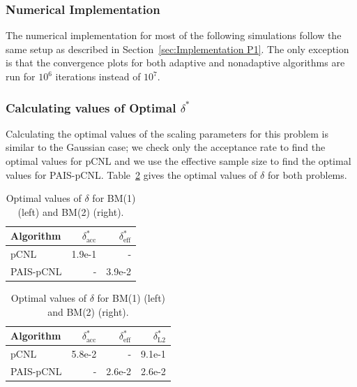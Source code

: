 \documentclass[final]{siamltex}
\begin{document}
\subsubsection{Numerical Implementation}\label{sec:Implementation P2}

The numerical implementation for most of the following simulations follow the same setup as described in Section~\ref{sec:Implementation P1}. The only exception is that the convergence plots for both adaptive and nonadaptive algorithms are run for $10^6$ iterations instead of $10^7$.

\subsubsection{Calculating values of Optimal $\delta^*$}\label{sec:BM1_opt_delta}

Calculating the optimal values of the scaling parameters for this problem is similar to the Gaussian case; we check only the acceptance rate to find the optimal values for pCNL and we use the effective sample size to find the optimal values for PAIS-pCNL. Table~\ref{table:BM_opt_delta} gives the optimal values of $\delta$ for both problems.

\begin{table}[!htb]
    \begin{minipage}{.5\linewidth}
      \centering
        \begin{tabular}{|l|r|r|}
	\hline
	Algorithm							& $\delta^*_{\text{acc}}$	& $\delta^*_{\text{eff}}$ \\ \hline
	pCNL								& 1.9e-1					& - \\
	PAIS-pCNL							& -						& 3.9e-2\\
	\hline
	\end{tabular}
    \end{minipage}%
    \begin{minipage}{.5\linewidth}
      \centering
        \begin{tabular}{|l|r|r|r|}
	\hline
	Algorithm							& $\delta^*_{\text{acc}}$	& $\delta^*_{\text{eff}}$	& $\delta^*_{\text{L2}}$ \\ \hline
	pCNL								& 5.8e-2					& - 						& 9.1e-1\\
	PAIS-pCNL							& -						& 2.6e-2 					& 2.6e-2\\
	\hline
	\end{tabular}
    \end{minipage}
	\caption{Optimal values of $\delta$ for BM(1) (left) and BM(2) (right).}
	\label{table:BM_opt_delta}
\end{table}
\end{document}
